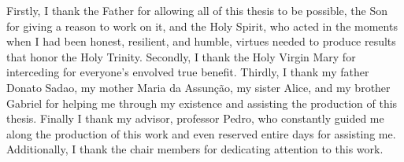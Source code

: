 Firstly, I thank the Father for allowing all of this thesis to be possible, the Son for giving a reason to work on it, and the Holy Spirit, who acted in the moments when I had been honest, resilient, and humble, virtues needed to produce results that honor the Holy Trinity. Secondly, I thank the Holy Virgin Mary for interceding for everyone's envolved true benefit. Thirdly, I thank my father Donato Sadao, my mother Maria da Assunção, my sister Alice, and my brother Gabriel for helping me through my existence and assisting the production of this thesis. Finally I thank my advisor, professor Pedro, who constantly guided me along the production of this work and even reserved entire days for assisting me. Additionally, I thank the chair members for dedicating attention to this work.
